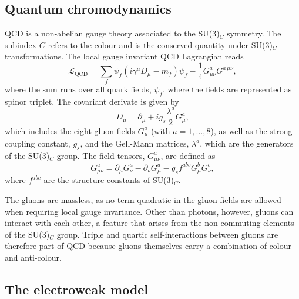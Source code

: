 \subsection{Quantum chromodynamics}
QCD is a non-abelian gauge theory associated to the SU(3)$_C$ symmetry. The subindex $C$ refers to the colour and is the conserved quantity under SU(3)$_C$ transformations.
The local gauge invariant QCD Lagrangian reads
\begin{equation}
  \mathcal{L}_{\text{QCD}} = \sum_f \bar{\psi_f}(i\gamma^\mu D_\mu - m_f)\psi_f - \frac{1}{4}G_{\mu\nu}^aG^{a\,\mu\nu},  \label{eq:lqcd}
\end{equation}
where the sum runs over all quark fields, $\psi_f$, where the fields are represented as spinor triplet. 
The covariant derivate is given by
\begin{equation}
    D_\mu = \partial_\mu + i g_s \frac{\lambda^a}{2} G_\mu^a,
\end{equation}
which includes the eight gluon fields $G_\mu^a$ (with $a = 1, \ldots, 8$), as well as the strong coupling constant, $g_s$, and the Gell-Mann matrices, $\lambda^a$, which are the generators of the SU(3)$_C$ group.
The field tensors, $G_{\mu\nu}^a$, are defined as
\begin{equation}
  \label{eq:qcd-tensor}
  G_{\mu\nu}^a = \partial_\mu G_\nu^a - \partial_\nu G_\mu^a - g_s f^{abc}G_\mu^b G_\nu^c,
\end{equation}
where $f^{abc}$ are the structure constants of SU(3)$_C$. 

The gluons are massless, as no term quadratic in the gluon fields are allowed when requiring local gauge invariance. Other than photons, however, gluons can interact with each other, a feature that arises from the non-commuting elements of the SU(3)$_C$ group. Triple and quartic self-interactions between gluons are therefore part of QCD because gluons themselves carry a combination of colour and anti-colour. 



\subsection{The electroweak model}

